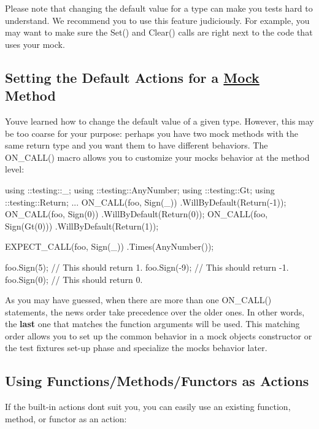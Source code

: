 Please note that changing the default value for a type can make you tests hard to understand. We recommend you to use this feature judiciously. For example, you may want to make sure the {\ttfamily Set()} and {\ttfamily Clear()} calls are right next to the code that uses your mock.

\subsection*{Setting the Default Actions for a \hyperlink{class_mock}{Mock} Method}

You\textquotesingle{}ve learned how to change the default value of a given type. However, this may be too coarse for your purpose\+: perhaps you have two mock methods with the same return type and you want them to have different behaviors. The {\ttfamily O\+N\+\_\+\+C\+A\+L\+L()} macro allows you to customize your mock\textquotesingle{}s behavior at the method level\+:


\begin{DoxyCode}
using ::testing::\_;
using ::testing::AnyNumber;
using ::testing::Gt;
using ::testing::Return;
...
  ON\_CALL(foo, Sign(\_))
      .WillByDefault(Return(-1));
  ON\_CALL(foo, Sign(0))
      .WillByDefault(Return(0));
  ON\_CALL(foo, Sign(Gt(0)))
      .WillByDefault(Return(1));

  EXPECT\_CALL(foo, Sign(\_))
      .Times(AnyNumber());

  foo.Sign(5);   // This should return 1.
  foo.Sign(-9);  // This should return -1.
  foo.Sign(0);   // This should return 0.
\end{DoxyCode}


As you may have guessed, when there are more than one {\ttfamily O\+N\+\_\+\+C\+A\+L\+L()} statements, the news order take precedence over the older ones. In other words, the {\bfseries last} one that matches the function arguments will be used. This matching order allows you to set up the common behavior in a mock object\textquotesingle{}s constructor or the test fixture\textquotesingle{}s set-\/up phase and specialize the mock\textquotesingle{}s behavior later.

\subsection*{Using Functions/\+Methods/\+Functors as Actions}

If the built-\/in actions don\textquotesingle{}t suit you, you can easily use an existing function, method, or functor as an action\+:



